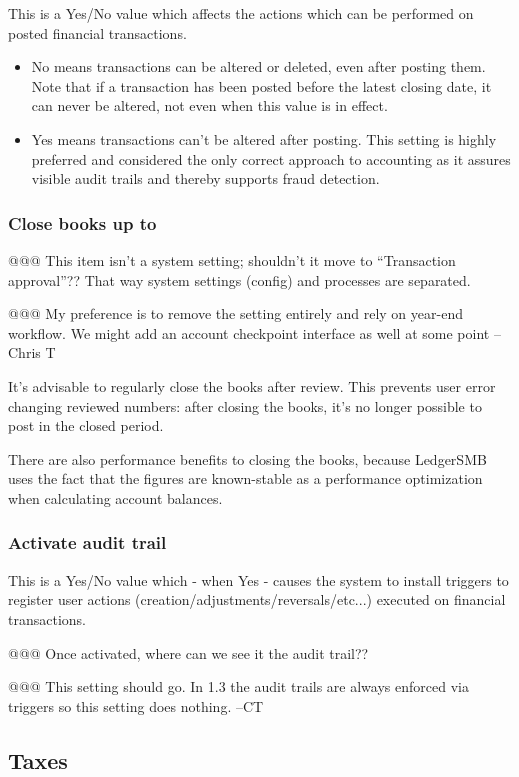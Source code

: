 This is a Yes/No value which affects the actions which can be performed on posted financial transactions.
\begin{itemize}
\item No means transactions can be altered or deleted, even after posting them. Note that
if a transaction has been posted before the latest closing date, it can never be altered,
not even when this value is in effect.
\item Yes means transactions can't be altered after posting. This setting is highly preferred and considered the only correct approach to accounting as it assures visible
audit trails and thereby supports fraud detection.
\end{itemize}

\subsubsection{Close books up to}

@@@ This item isn't a system setting; shouldn't it move to ``Transaction approval''?? That way system settings (config) and processes are separated.

@@@ My preference is to remove the setting entirely and rely on year-end 
workflow.  We might add an account checkpoint interface as well at some point
--Chris T

It's advisable to regularly close the books after review. This prevents user error changing
reviewed numbers: after closing the books, it's no longer possible to post in the closed
period.

There are also performance benefits to closing the books, because LedgerSMB uses the
fact that the figures are known-stable as a performance optimization when calculating
account balances.

\subsubsection{Activate audit trail}

This is a Yes/No value which - when Yes - causes the system to install triggers to register
user actions (creation/adjustments/reversals/etc...) executed on financial transactions.


@@@ Once activated, where can we see it the audit trail??

@@@ This setting should go.  In 1.3 the audit trails are always enforced via
triggers so this setting does nothing.  --CT

\subsection{Taxes}

